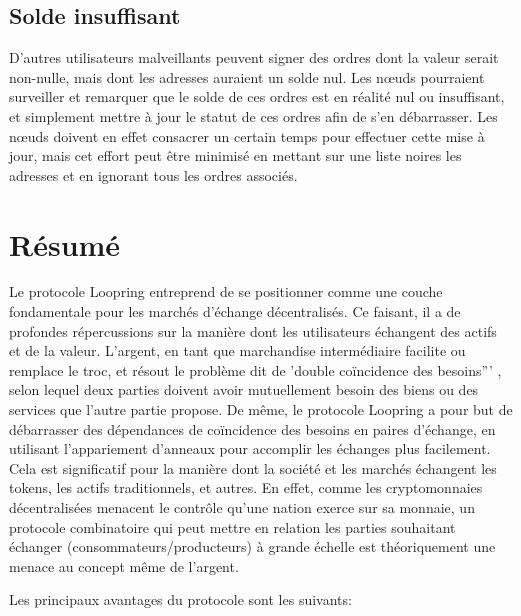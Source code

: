\documentclass[UTF8,nofonts]{article}
\begin{document}
\begin{multicols}{2}
\subsection{Solde insuffisant}
D'autres utilisateurs malveillants peuvent signer des ordres dont la valeur serait non-nulle, mais dont les adresses auraient un solde nul. Les nœuds pourraient surveiller et remarquer que le solde de ces ordres est en réalité nul ou insuffisant, et simplement mettre à jour le statut de ces ordres afin de s'en débarrasser. Les nœuds doivent en effet consacrer un certain temps pour effectuer cette mise à jour, mais cet effort peut être minimisé en mettant sur une liste noires les adresses et en ignorant tous les ordres associés.

\section{Résumé}

Le protocole Loopring entreprend de se positionner comme une couche fondamentale pour les marchés d'échange décentralisés. Ce faisant, il a de profondes répercussions sur la manière dont les utilisateurs échangent des actifs et de la valeur. L'argent, en tant que marchandise intermédiaire facilite ou remplace le troc, et résout le problème dit de 'double coïncidence  des besoins''' \cite{unenumerated2006}, selon lequel deux parties doivent avoir mutuellement besoin des biens ou des services que l'autre partie propose. De même, le protocole Loopring a pour but de débarrasser des dépendances de coïncidence des besoins en paires d'échange, en utilisant l'appariement d'anneaux pour accomplir les échanges plus facilement. Cela est significatif pour la manière dont la société et les marchés échangent les tokens, les actifs traditionnels, et autres. En effet, comme les cryptomonnaies décentralisées menacent le contrôle qu'une nation exerce sur sa monnaie, un protocole combinatoire qui peut mettre en relation les parties souhaitant échanger (consommateurs/producteurs) à grande échelle est théoriquement une menace au concept même de l'argent. 

Les principaux avantages du protocole sont les suivants:


\end{multicols}
\end{document}
